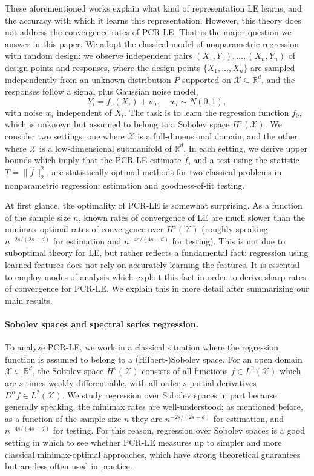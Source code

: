 \documentclass{article}
\theoremstyle{definition}
\def\R{\mathbb{R}}
\newcommand{\wh}[1]{\widehat{#1}}
\newcommand{\mc}[1]{\mathcal{#1}}
\newcommand{\Reals}{\mathbb{R}} %
\newcommand{\Rd}{\Reals^d}
\newcommand{\1}{\mathbf{1}}
\begin{document}
	These aforementioned works explain what kind of representation LE learns, and the accuracy with which it learns this representation. However, this theory does not address the convergence rates of PCR-LE. That is the major question we answer in this paper. We adopt the classical model of nonparametric regression with random design: we observe independent pairs $(X_1,Y_1),\ldots,(X_n,Y_n)$ of design points and responses, where the design points $\{X_1,\ldots,X_n\}$ are sampled independently from an unknown distribution $P$ supported on $\mc{X} \subseteq \Rd$, and the responses follow a signal plus Gaussian noise model,
	\begin{equation}
	\label{eqn:model}
	Y_i = f_0(X_i) + w_i, \quad w_i \sim N(0,1),
	\end{equation}
	with noise $w_i$ independent of $X_i$. The task is to learn the regression function $f_0$, which is unknown but assumed to belong to a Sobolev space $H^s(\mc{X})$. We consider two settings: one where $\mc{X}$ is a full-dimensional domain, and the other where $\mc{X}$ is a low-dimensional submanifold of $\Rd$. In each setting, we derive upper bounds which imply that the PCR-LE estimate $\wh{f}$, and a test using the statistic $T = \|\wh{f}\|_2^2$, are statistically optimal methods for two classical problems in nonparametric regression: estimation and goodness-of-fit testing. 
	
	At first glance, the optimality of PCR-LE is somewhat surprising. As a function of the sample size $n$, known rates of convergence of LE are much slower than the minimax-optimal rates of convergence over $H^s(\mc{X})$ (roughly speaking $n^{-2s/(2s + d)}$ for estimation and $n^{-4s/(4s + d)}$ for testing). This is not due to suboptimal theory for LE, but rather reflects a fundamental fact: regression using learned features does not rely on accurately learning the features. It is essential to employ modes of analysis which exploit this fact in order to derive sharp rates of convergence for PCR-LE. We explain this in more detail after summarizing our main results.
	
	\paragraph{Sobolev spaces and spectral series regression.}
	To analyze PCR-LE, we work in a classical situation where the regression function is assumed to belong to a (Hilbert-)Sobolev space. For an open domain $\mc{X} \subseteq \Rd$, the Sobolev space $H^s(\mc{X})$ consists of all functions $f \in L^2(\mc{X})$ which are $s$-times weakly differentiable, with all order-$s$ partial derivatives $D^{\alpha}f \in L^2(\mc{X})$. We study regression over Sobolev spaces in part because generally speaking, the minimax rates are well-understood; as mentioned before, as a function of the sample size $n$ they are $n^{-2s/(2s + d)}$ for estimation, and $n^{-4s/(4s + d)}$ for testing. For this reason, regression over Sobolev spaces is a good setting in which to see whether PCR-LE measures up to simpler and more classical minimax-optimal approaches, which have strong theoretical guarantees but are less often used in practice.
	
\end{document}
